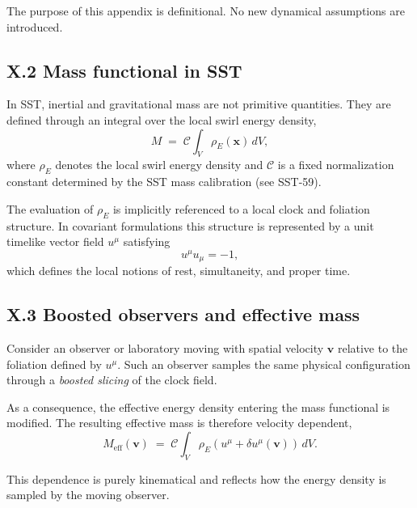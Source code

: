 \documentclass[10pt]{article}
\begin{document}
        The purpose of this appendix is definitional. No new dynamical assumptions are
        introduced.

    \subsection*{X.2 Mass functional in SST}

        In SST, inertial and gravitational mass are not primitive quantities.
        They are defined through an integral over the local swirl energy density,
        \begin{equation}
            M \;=\; \mathcal{C} \int_V \rho_{\!E}(\mathbf{x}) \, dV ,
        \end{equation}
        where $\rho_{\!E}$ denotes the local swirl energy density and $\mathcal{C}$ is a
        fixed normalization constant determined by the SST mass calibration
        (see SST-59).

        The evaluation of $\rho_{\!E}$ is implicitly referenced to a local clock and
        foliation structure. In covariant formulations this structure is represented
        by a unit timelike vector field $u^\mu$ satisfying
        \begin{equation}
            u^\mu u_\mu = -1 ,
        \end{equation}
        which defines the local notions of rest, simultaneity, and proper time.

    \subsection*{X.3 Boosted observers and effective mass}

        Consider an observer or laboratory moving with spatial velocity $\mathbf{v}$
        relative to the foliation defined by $u^\mu$.
        Such an observer samples the same physical configuration through a
        \emph{boosted slicing} of the clock field.

        As a consequence, the effective energy density entering the mass functional
        is modified. The resulting effective mass is therefore velocity dependent,
        \begin{equation}
            M_{\mathrm{eff}}(\mathbf{v})
            \;=\;
            \mathcal{C}
            \int_V
            \rho_{\!E}\!\left(u^\mu + \delta u^\mu(\mathbf{v})\right)
            \, dV .
        \end{equation}

        This dependence is purely kinematical and reflects how the energy density is
        sampled by the moving observer.
\end{document}
